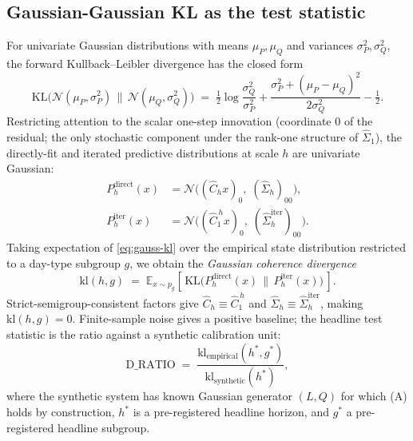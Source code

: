 \documentclass[11pt]{article}
\newcommand{\E}{\mathbb{E}}
\newcommand{\Nrm}{\mathcal{N}}
\newcommand{\KL}{\mathrm{KL}}
\theoremstyle{definition}
\theoremstyle{plain}
\begin{document}
\subsection{Gaussian-Gaussian KL as the test statistic}
\label{sec:gauss-kl}

For univariate Gaussian distributions with means $\mu_P, \mu_Q$
and variances $\sigma_P^2, \sigma_Q^2$, the forward
Kullback--Leibler divergence has the closed form
\begin{equation}
  \label{eq:gauss-kl}
  \KL\!\bigl(\Nrm(\mu_P, \sigma_P^2)\,\|\,\Nrm(\mu_Q, \sigma_Q^2)\bigr)
  \;=\;
  \tfrac{1}{2}\log\!\frac{\sigma_Q^2}{\sigma_P^2}
  + \frac{\sigma_P^2 + (\mu_P - \mu_Q)^2}{2 \sigma_Q^2}
  - \tfrac{1}{2}.
\end{equation}
Restricting attention to the scalar one-step innovation
(coordinate $0$ of the residual; the only stochastic component
under the rank-one structure of $\hat\Sigma_1$), the directly-fit
and iterated predictive distributions at scale $h$ are univariate
Gaussian:
\begin{align*}
  P_h^{\mathrm{direct}}(x) &= \Nrm\!\bigl((\hat C_h x)_0,\; (\hat\Sigma_h)_{00}\bigr), \\
  P_h^{\mathrm{iter}}(x) &= \Nrm\!\bigl((\hat C_1^{\,h} x)_0,\; (\hat\Sigma_h^{\mathrm{iter}})_{00}\bigr).
\end{align*}
Taking expectation of \eqref{eq:gauss-kl} over the empirical state
distribution restricted to a day-type subgroup $g$, we obtain the
\emph{Gaussian coherence divergence}
\begin{equation}
  \label{eq:gauss-cd}
  \mathrm{kl}(h, g) \;=\;
  \E_{x \sim p_g}\!\left[\,
    \KL\!\bigl(P_h^{\mathrm{direct}}(x) \,\|\, P_h^{\mathrm{iter}}(x)\bigr)
  \,\right].
\end{equation}
Strict-semigroup-consistent factors give $\hat C_h \equiv \hat C_1^{\,h}$
and $\hat\Sigma_h \equiv \hat\Sigma_h^{\mathrm{iter}}$, making
$\mathrm{kl}(h, g) = 0$. Finite-sample noise gives a positive
baseline; the headline test statistic is the ratio against a
synthetic calibration unit:
\begin{equation}
  \label{eq:dratio}
  \mathrm{D\_RATIO}
  \;=\;
  \frac{\mathrm{kl}_{\text{empirical}}(h^{*}, g^{*})}
       {\mathrm{kl}_{\text{synthetic}}(h^{*})},
\end{equation}
where the synthetic system has known Gaussian generator $(L, Q)$
for which (A) holds by construction, $h^{*}$ is a pre-registered
headline horizon, and $g^{*}$ a pre-registered headline subgroup.
\end{document}
